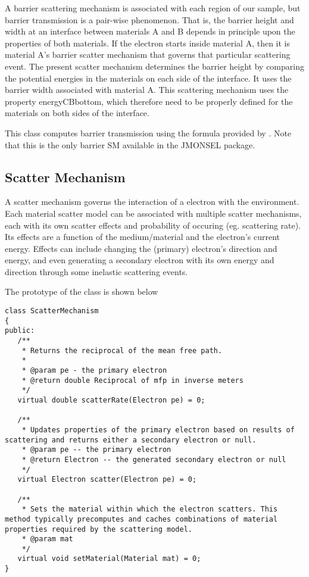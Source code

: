 A barrier scattering mechanism is associated with each region of our sample, but barrier transmission is a pair-wise phenomenon. That is, the barrier height and width at an interface between materials A and B depends in principle upon the properties of both materials. If the electron starts inside material A, then it is material A's barrier scatter mechanism that governs that particular scattering event. The present scatter mechanism determines the barrier height by comparing the potential energies in the materials on each side of the interface. It uses the barrier width associated with material A. This scattering mechanism uses the property energyCBbottom, which therefore need to be properly defined for the materials on both sides of the interface.

This class computes barrier transmission using the formula provided by \cite{Landau}. Note that this is the only barrier SM available in the JMONSEL package. 

\subsection{Scatter Mechanism}\label{impl:sm}
A scatter mechanism governs the interaction of a electron with the environment. Each material scatter model can be associated with multiple scatter mechanisms, each with its own scatter effects and probability of occuring (eg. scattering rate). Its effects are a function of the medium/material and the electron's current energy. Effects can include changing the (primary) electron's direction and energy, and even generating a secondary electron with its own energy and direction through some inelastic scattering events. 

The prototype of the class is shown below
\begin{lstlisting}
class ScatterMechanism
{
public:
   /**
    * Returns the reciprocal of the mean free path.
    *
    * @param pe - the primary electron
    * @return double Reciprocal of mfp in inverse meters
    */
   virtual double scatterRate(Electron pe) = 0;

   /**
    * Updates properties of the primary electron based on results of scattering and returns either a secondary electron or null.
    * @param pe -- the primary electron
    * @return Electron -- the generated secondary electron or null
    */
   virtual Electron scatter(Electron pe) = 0;

   /**
    * Sets the material within which the electron scatters. This method typically precomputes and caches combinations of material properties required by the scattering model.
    * @param mat
    */
   virtual void setMaterial(Material mat) = 0;
}
\end{lstlisting}


